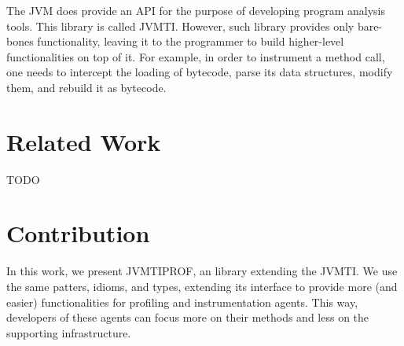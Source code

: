The JVM does provide an API for the purpose of developing program analysis tools. This library is called JVMTI. However, such library provides only bare-bones functionality, leaving it to the programmer to build higher-level functionalities on top of it. For example, in order to instrument a method call, one needs to intercept the loading of bytecode, parse its data structures, modify them, and rebuild it as bytecode.


\section{Related Work}

TODO










\section{Contribution}

In this work, we present JVMTIPROF, an library extending the JVMTI. We use the same patters, idioms, and types, extending its interface to provide more (and easier) functionalities for profiling and instrumentation agents. This way, developers of these agents can focus more on their methods and less on the supporting infrastructure.

